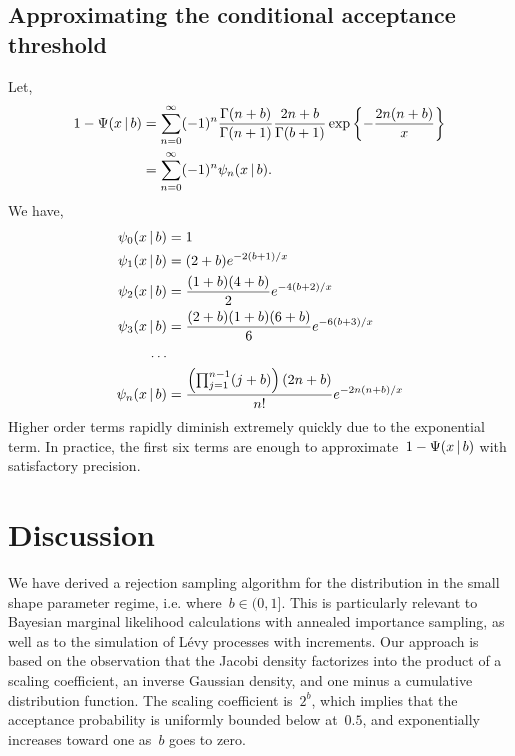 \documentclass[aos,preprint]{imsart}
\begin{document}
\subsection{Approximating the conditional acceptance threshold}
Let,
\begin{align}
1-\Psi(x \given b) 
  &=
    \sum_{n=0}^\infty (-1)^n \frac{\Gamma(n+b)}{\Gamma(n+1)} \frac{2n+b}{\Gamma(b+1)}
    \exp\left\{- \frac{2n(n+b)}{x} \right\} \\
  &= \sum_{n=0}^\infty (-1)^n \psi_n(x \given b).
\end{align}
We have,
\begin{align}
\psi_0(x \given b) &= 1 \\
\psi_1(x \given b) &= (2+b) e^{-2(b+1) / x} \\
\psi_2(x \given b) &= \frac{(1+b)(4+b)}{2} e^{-4(b+2) / x} \\
\psi_3(x \given b) &= \frac{(2+b)(1+b)(6+b)}{6} e^{-6(b+3) / x} \\
\nonumber \ldots & \\
\psi_n(x \given b) &= \frac{\left(\prod_{j=1}^{n-1} (j+b) \right) (2n+b)}{n!} e^{-2n(n+b)/x} 
\end{align}
Higher order terms rapidly diminish extremely quickly due to the
exponential term. In practice, the first six terms are enough to
approximate~$1-\Psi(x \,|\, b)$ with satisfactory precision. 

\section{Discussion}
We have derived a rejection sampling algorithm for the \polyagamma distribution 
in the small shape parameter regime, i.e. where~$b \in (0,1]$. This is 
particularly relevant to Bayesian marginal likelihood calculations with 
annealed importance sampling, as well as to the simulation of L\'{e}vy 
processes with \polyagamma increments. Our approach is based on the observation 
that the Jacobi density factorizes into the product of a scaling coefficient, 
an inverse Gaussian density, and one minus a cumulative distribution function.
The scaling coefficient is~$2^b$, which implies that the acceptance probability 
is uniformly bounded below at~$0.5$, and exponentially increases toward one 
as~$b$ goes to zero. 



\end{document}

